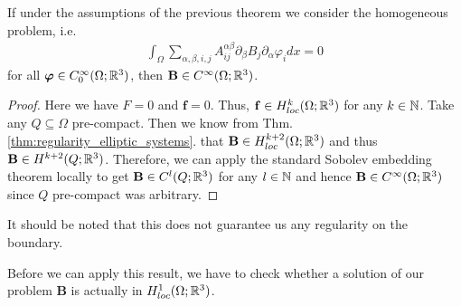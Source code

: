 \documentclass[../main.tex]{subfiles}
\begin{document}
\begin{corollary}\label{cor:smooth_solution}
    If under the assumptions of the previous theorem we consider the 
    homogeneous problem, i.e.
    \begin{align*}
        \int_\Omega \sum\limits_{\alpha,\beta,i,j} 
        A_{ij}^{\alpha \beta} \partial_\beta B_j \partial_\alpha \varphi_i dx =0
    \end{align*}
    for all $\bm{\varphi} \in C^\infty_0(\Omega;\mathbb{R}^3)$, then $\mathbf{B}\in C^\infty(\Omega;\mathbb{R}^3)$.
\end{corollary}
\begin{proof}
    Here we have $F= 0$ and $\mathbf{f} = 0$. Thus, $\mathbf{f} \in H^k_{loc}(\Omega;\mathbb{R}^3)$ 
    for any $k \in \mathbb{N}$. 
    Take any $Q \subseteq \Omega$ pre-compact. Then we know from 
    Thm.\,\ref{thm:regularity_elliptic_systems}.
    that $\mathbf{B} \in H_{loc}^{k+2}(\Omega;\mathbb{R}^3)$ and thus $\mathbf{B} \in H^{k+2}(Q;\mathbb{R}^3)$.
    Therefore, we can apply the 
    standard Sobolev embedding theorem locally to get $\mathbf{B} \in C^l(Q;\mathbb{R}^3)$ for any 
    $l \in \mathbb{N}$ and hence $\mathbf{B} \in C^\infty(\Omega;\mathbb{R}^3)$ since $Q$ pre-compact
    was arbitrary. 
\end{proof}
It should be noted that this does not guarantee us any regularity on the 
boundary. 

Before we can apply this result, we have to check whether a solution of our 
problem $\mathbf{B}$ is actually in $H^1_{loc}(\Omega;\mathbb{R}^3)$. 
\end{document}
